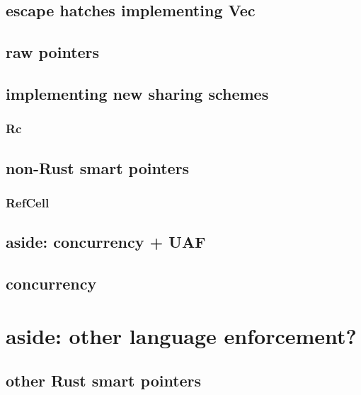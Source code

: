 \subsection{escape hatches implementing Vec}


\subsection{raw pointers}



\subsection{implementing new sharing schemes}
\subsubsection{Rc}


\subsection{non-Rust smart pointers}


\subsubsection{RefCell}


\subsection{aside: concurrency + UAF}


\subsection{concurrency}


\section{aside: other language enforcement?}



\subsection{other Rust smart pointers}


